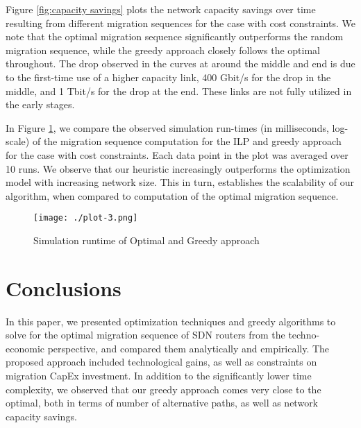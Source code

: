 \documentclass[conference]{IEEEtran}
\begin{document}
\par Figure \ref{fig:capacity savings} plots the network capacity savings over
time resulting from different migration sequences for the case with cost
constraints. We note that the optimal migration sequence significantly
outperforms the random migration sequence, while the greedy approach closely
follows the optimal throughout. The drop observed in the curves at around
the middle and end is due to the first-time use of a higher capacity link, 400
Gbit/s for the drop in the middle, and 1 Tbit/s for the drop at the end. These
links are not fully utilized in the early stages.

\par In Figure \ref{fig:run-times}, we compare the observed simulation run-times
(in milliseconds, log-scale) of the migration sequence computation for the ILP
and greedy approach for the case with cost constraints.
Each data point in the plot was averaged over 10 runs.
We observe that our heuristic increasingly outperforms the optimization model
with increasing network size. This in turn, establishes the scalability of our
algorithm, when compared to computation of the optimal migration sequence.

\begin{figure}
\begin{center}
\texttt{[image: ./plot-3.png]}
\caption{Simulation runtime of Optimal and Greedy approach}
\label{fig:run-times}
\end{center}
\vspace{-5mm}
\end{figure}

\section{Conclusions}\label{sec:conclusion}

\par In this paper, we presented optimization techniques and greedy algorithms to solve for the optimal migration sequence of
SDN routers from the techno-economic perspective, and compared them analytically and empirically. The proposed approach included technological
gains, as well as constraints on migration CapEx investment.
In addition to the significantly lower time complexity, we observed that our
greedy approach comes very close to the optimal, both in terms of number of
alternative paths, as well as network capacity savings.



\end{document}
